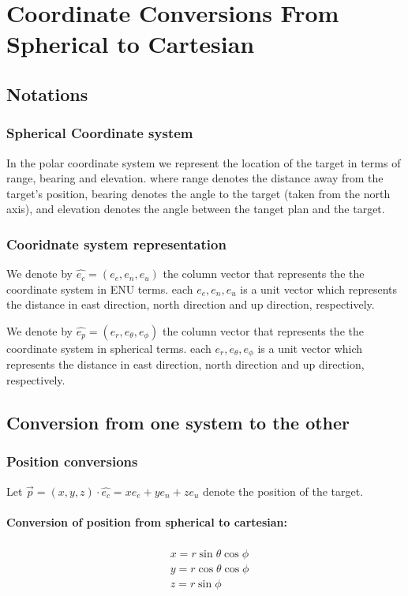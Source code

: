 \documentclass{article}
\newcommand{\east}{e_e}
\newcommand{\north}{e_n}
\newcommand{\up}{e_u}
\newcommand{\range}{e_r}
\newcommand{\bearing}{e_\theta}
\newcommand{\elevation}{e_\phi}
\newcommand{\carvec}{\hat{e_{c}}}
\newcommand{\polvec}{\hat{e_{p}}}
\begin{document}
\section{Coordinate Conversions From Spherical to Cartesian}

\subsection{Notations}
\subsubsection{Spherical Coordinate system}
In the polar coordinate system we represent the location of the target in terms
of range, bearing and elevation. where range denotes the distance away from the
target's position, bearing denotes the angle to the target (taken from the north
axis), and elevation denotes the angle between the tanget plan and the target.


\subsubsection{Cooridnate system representation}

We denote by $\carvec=(\east,\north, \up)$ the column vector that represents
the the coordinate system in ENU terms. each $\east,\north, \up$ is a unit vector
which represents the distance in east direction, north direction and up
direction, respectively.

We denote by $\polvec=(\range,\bearing,\elevation)$ the column vector that
represents the the coordinate system in spherical terms. each $\range,\bearing,\elevation$ is a
unit vector which represents the distance in east direction, north direction and up
direction, respectively.

\subsection{Conversion from one system to the other}

\subsubsection{Position conversions}
Let $\vec{p} = (x,y,z) \cdot \carvec = x\east + y\north + z\up$ denote the
position of the target.


\paragraph{Conversion of position from spherical to cartesian:}
\begin{align}\label{eq:cartesian-position}
\begin{split}
{}& x=r\sin \theta \cos \phi \\
{}& y=r\cos \theta \cos \phi \\
{}& z=r\sin \phi
\end{split}
\end{align}
\end{document}

